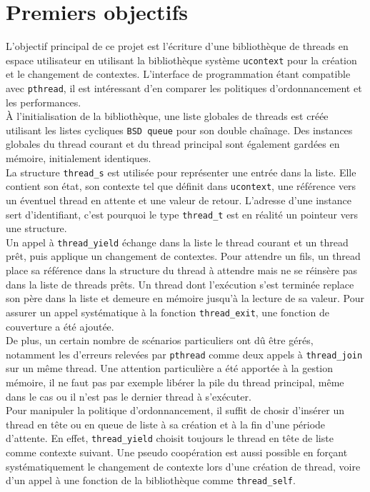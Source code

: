 \section{Premiers objectifs}

L'objectif principal de ce projet est l'écriture d'une bibliothèque de threads en espace utilisateur en utilisant la bibliothèque système \texttt{ucontext} pour la création et le changement de contextes. L'interface de programmation étant compatible avec \texttt{pthread}, il est intéressant d'en comparer les politiques d'ordonnancement et les performances.
\\

\`{A} l'initialisation de la bibliothèque, une liste globales de threads est créée utilisant les listes cycliques \texttt{BSD queue} pour son double chaînage. Des instances globales du thread courant et du thread principal sont également gardées en mémoire, initialement identiques.
\\

La structure \texttt{thread\_s} est utilisée pour représenter une entrée dans la liste. Elle contient son état, son contexte tel que définit dans \texttt{ucontext}, une référence vers un éventuel thread en attente et une valeur de retour. L'adresse d'une instance sert d'identifiant, c'est pourquoi le type \texttt{thread\_t} est en réalité un pointeur vers une structure.
\\

Un appel à \texttt{thread\_yield} échange dans la liste le thread courant et un thread prêt, puis applique un changement de contextes. Pour attendre un fils, un thread place sa référence dans la structure du thread à attendre mais ne se réinsère pas dans la liste de threads prêts. Un thread dont l'exécution s'est terminée replace son père dans la liste et demeure en mémoire jusqu'à la lecture de sa valeur. Pour assurer un appel systématique à la fonction \texttt{thread\_exit}, une fonction de couverture a été ajoutée.
\\

De plus, un certain nombre de scénarios particuliers ont dû être gérés, notamment les d'erreurs relevées par \texttt{pthread} comme deux appels à \texttt{thread\_join} sur un même thread. Une attention particulière a été apportée à la gestion mémoire, il ne faut pas par exemple libérer la pile du thread principal, même dans le cas ou il n'est pas le dernier thread à s'exécuter.
\\

Pour manipuler la politique d'ordonnancement, il suffit de chosir d'insérer un thread en tête ou en queue de liste à sa création et à la fin d'une période d'attente. En effet, \texttt{thread\_yield} choisit toujours le thread en tête de liste comme contexte suivant. Une pseudo coopération est aussi possible en forçant systématiquement le changement de contexte lors d'une création de thread, voire d'un appel à une fonction de la bibliothèque comme \texttt{thread\_self}.
\\